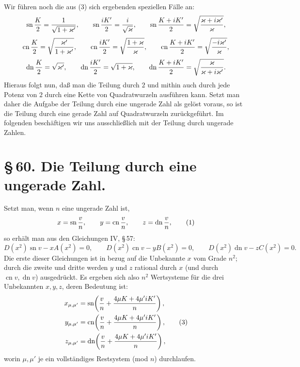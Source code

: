 \documentclass[11pt]{article}
\providecommand{\sn}{\operatorname{sn}}
\providecommand{\cn}{\operatorname{cn}}
\providecommand{\dn}{\operatorname{dn}}
\begin{document}
Wir führen noch die aus (3) sich ergebenden speziellen Fälle an:
\[
\sn {K\over2}={1\over\sqrt{1+\varkappa'}},\qquad
\sn {iK'\over2}={i\over\sqrt{\varkappa}},\qquad
\sn {K+iK'\over2}=\sqrt{{\varkappa+i\varkappa'}\over\varkappa},
\]
\[
\cn {K\over2}=\sqrt{{\varkappa'\over1+\varkappa'}},\qquad
\cn {iK'\over2}=\sqrt{{1+\varkappa\over\varkappa}},\qquad
\cn {K+iK'\over2}=\sqrt{{-i\varkappa'\over\varkappa}},
\]
\[
\dn {K\over2}=\sqrt{\varkappa'},\qquad
\dn {iK'\over2}=\sqrt{1+\varkappa},\qquad
\dn {K+iK'\over2}=\sqrt{{\varkappa\over\varkappa+i\varkappa'}}.
\]
Hieraus folgt nun, daß man die Teilung durch $2$ und mithin auch durch jede Potenz von
$2$ durch eine Kette von Quadratwurzeln ausführen kann. Setzt man daher die Aufgabe der
Teilung durch eine ungerade Zahl als gelöst voraus, so ist die Teilung durch eine gerade
Zahl auf Quadratwurzeln zurückgeführt. Im folgenden beschäftigen wir uns ausschließlich
mit der Teilung durch ungerade Zahlen.

\section*{\S\,60. Die Teilung durch eine ungerade Zahl.}

Setzt man, wenn $n$ eine ungerade Zahl ist,
\begin{equation}
x=\sn {v\over n},\qquad y=\cn {v\over n},\qquad z=\dn {v\over n},
\tag{1}
\end{equation}
so erhält man aus den Gleichungen IV, \S\,57:
\begin{equation}
D(x^2)\sn v-xA(x^2)=0,\qquad
D(x^2)\cn v-yB(x^2)=0,\qquad
D(x^2)\dn v-zC(x^2)=0.
\tag{2}
\end{equation}
Die erste dieser Gleichungen ist in bezug auf die Unbekannte $x$ vom Grade $n^2$;
durch die zweite und dritte werden $y$ und $z$ rational durch $x$ (und durch
$\cn v,\dn v$) ausgedrückt. Es ergeben sich also $n^2$ Wertsysteme für die drei Unbekannten
$x,y,z$, deren Bedeutung ist:
\begin{equation}
\begin{aligned}
x_{\mu,\mu'}&=\sn\!\left({v\over n}+{4\mu K+4\mu'iK'\over n}\right),\\
y_{\mu,\mu'}&=\cn\!\left({v\over n}+{4\mu K+4\mu'iK'\over n}\right),\\
z_{\mu,\mu'}&=\dn\!\left({v\over n}+{4\mu K+4\mu'iK'\over n}\right),
\end{aligned}
\tag{3}
\end{equation}
worin $\mu,\mu'$ je ein vollständiges Restsystem (mod $n$) durchlaufen.
\end{document}
